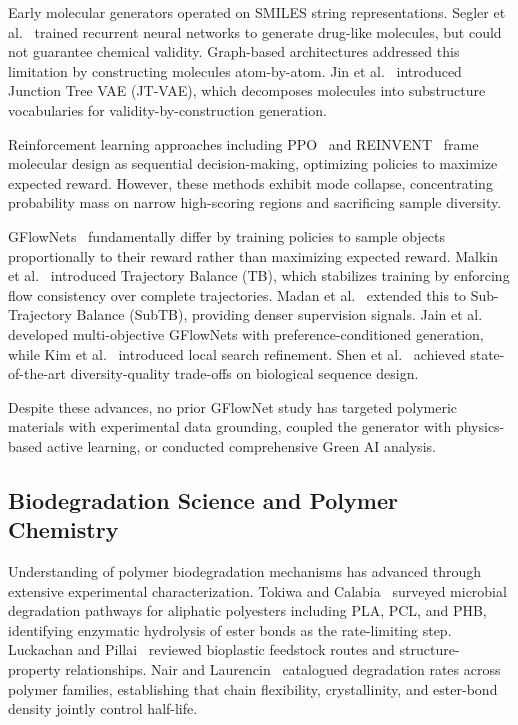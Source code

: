 \documentclass[twocolumn,10pt]{article}
\begin{document}
Early molecular generators operated on SMILES string representations. Segler et al.~\cite{segler2018generating} trained recurrent neural networks to generate drug-like molecules, but could not guarantee chemical validity. Graph-based architectures addressed this limitation by constructing molecules atom-by-atom. Jin et al.~\cite{jin2018junction} introduced Junction Tree VAE (JT-VAE), which decomposes molecules into substructure vocabularies for validity-by-construction generation.

Reinforcement learning approaches including PPO~\cite{schulman2017proximal} and REINVENT~\cite{olivecrona2017molecular} frame molecular design as sequential decision-making, optimizing policies to maximize expected reward. However, these methods exhibit mode collapse, concentrating probability mass on narrow high-scoring regions and sacrificing sample diversity.

GFlowNets~\cite{bengio2021flow,bengio2023gflownet} fundamentally differ by training policies to sample objects proportionally to their reward rather than maximizing expected reward. Malkin et al.~\cite{malkin2022trajectory} introduced Trajectory Balance (TB), which stabilizes training by enforcing flow consistency over complete trajectories. Madan et al.~\cite{madan2023learning} extended this to Sub-Trajectory Balance (SubTB), providing denser supervision signals. Jain et al.~\cite{jain2023mogfn} developed multi-objective GFlowNets with preference-conditioned generation, while Kim et al.~\cite{kim2024lsgfn} introduced local search refinement. Shen et al.~\cite{shen2023towards} achieved state-of-the-art diversity-quality trade-offs on biological sequence design.

Despite these advances, no prior GFlowNet study has targeted polymeric materials with experimental data grounding, coupled the generator with physics-based active learning, or conducted comprehensive Green AI analysis.

\subsection{Biodegradation Science and Polymer Chemistry}

Understanding of polymer biodegradation mechanisms has advanced through extensive experimental characterization. Tokiwa and Calabia~\cite{tokiwa2006biodegradability} surveyed microbial degradation pathways for aliphatic polyesters including PLA, PCL, and PHB, identifying enzymatic hydrolysis of ester bonds as the rate-limiting step. Luckachan and Pillai~\cite{luckachan2011biodegradable} reviewed bioplastic feedstock routes and structure-property relationships. Nair and Laurencin~\cite{nair2007biodegradable} catalogued degradation rates across polymer families, establishing that chain flexibility, crystallinity, and ester-bond density jointly control half-life.
\end{document}
